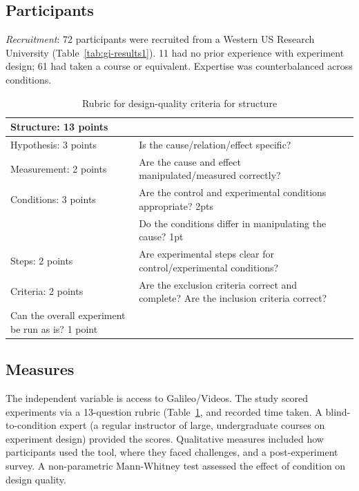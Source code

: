 \subsection*{Participants}
\textit{Recruitment}: 72 participants were recruited from a Western US Research University (Table~\ref{tab:gi-results1}). 11 had no prior experience with experiment design; 61 had taken a course or equivalent. Expertise was counterbalanced across conditions.   

\vspace{0.25in}
\begin{table}[!ht]
\caption[Rubric for design-quality criteria for structure]
{Rubric for design-quality criteria for structure}

\vspace{-0.25in}
\begin{center}
\begin{tabular}{|p{1in}|p{2in}|p{3in}|}
\hline
Structure: 13 points &  \\
\hline
Hypothesis: 3 points & Is the cause/relation/effect specific?  \\
\hline
Measurement: 2 points & Are the cause and effect manipulated/measured correctly? \\
\hline
Conditions: 3 points  & Are the control and experimental conditions appropriate? 2pts \\
 & Do the conditions differ in manipulating the cause? 1pt \\
\hline
Steps: 2 points  & Are experimental steps clear for control/experimental conditions?  \\
\hline
Criteria: 2 points & Are the exclusion criteria correct and complete? Are the inclusion criteria correct? \\
\hline
Can the overall experiment be run as is? 1 point \\
\hline
\end{tabular}
\end{center}
\label{tab:rubric1}
\end{table}

\subsection*{Measures}
The independent variable is access to Galileo/Videos. The study scored experiments via a 13-question rubric (Table~\ref{tab:rubric1}, and recorded time taken. A blind-to-condition expert (a regular instructor of large, undergraduate courses on experiment design) provided the scores. Qualitative measures included how participants used the tool, where they faced challenges, and a post-experiment survey. A non-parametric Mann-Whitney test assessed the effect of condition on design quality. 

